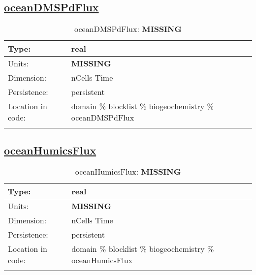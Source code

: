 \subsection[oceanDMSPdFlux]{\hyperref[sec:var_tab_biogeochemistry]{oceanDMSPdFlux}}
\label{subsec:var_sec_biogeochemistry_oceanDMSPdFlux}
\begin{center}
\begin{longtable}{| p{2.0in} | p{4.0in} |}
        \hline 
        Type: & real \\
        \hline 
        Units: & {\bf \color{red} MISSING} \\
        \hline 
        Dimension: & nCells Time \\
        \hline 
        Persistence: & persistent \\
        \hline 
         Location in code: & domain \% blocklist \% biogeochemistry \% oceanDMSPdFlux \\
         \hline 
    \caption{oceanDMSPdFlux: {\bf \color{red} MISSING}}
\end{longtable}
\end{center}
\subsection[oceanHumicsFlux]{\hyperref[sec:var_tab_biogeochemistry]{oceanHumicsFlux}}
\label{subsec:var_sec_biogeochemistry_oceanHumicsFlux}
\begin{center}
\begin{longtable}{| p{2.0in} | p{4.0in} |}
        \hline 
        Type: & real \\
        \hline 
        Units: & {\bf \color{red} MISSING} \\
        \hline 
        Dimension: & nCells Time \\
        \hline 
        Persistence: & persistent \\
        \hline 
         Location in code: & domain \% blocklist \% biogeochemistry \% oceanHumicsFlux \\
         \hline 
    \caption{oceanHumicsFlux: {\bf \color{red} MISSING}}
\end{longtable}
\end{center}
